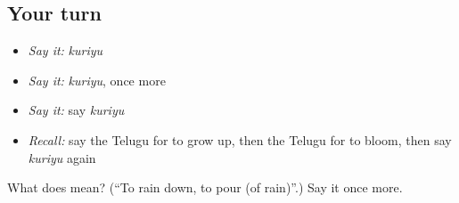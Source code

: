\subsection*{Your turn}
\begin{itemize}
\raggedright
  \item \emph{Say it:} \emph{kuriyu}
  \item \emph{Say it:} \emph{kuriyu}, once more
  \item \emph{Say it:} say \emph{kuriyu}
  \item \emph{Recall:} say the Telugu for to grow up, then the Telugu for to bloom, then say \emph{kuriyu} again
\end{itemize}

\begin{tcolorbox}[breakable,colback=teal!4,colframe=teal!35!black,title={Before you move on}]
What does  mean? (\textquotedblleft{}To rain down, to pour (of rain)\textquotedblright{}.) Say it once more.
\end{tcolorbox}

